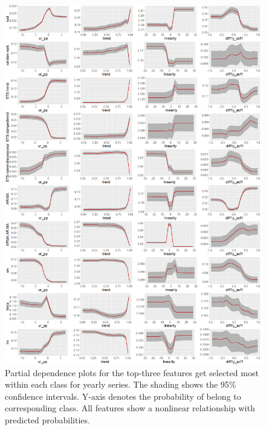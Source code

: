 \documentclass[11pt,a4paper,]{article}
\begin{document}
\begin{figure}
\centering
\includegraphics{figures/pdpyearly-1.png}
\caption{\label{fig:pdpyearly}Partial dependence plots for the top-three
features get selected most within each class for yearly series. The
shading shows the 95\% confidence intervals. Y-axis denotes the
probability of belong to corresponding class. All features show a
nonlinear relationship with predicted probabilities.}
\end{figure}

\newpage
\end{document}
